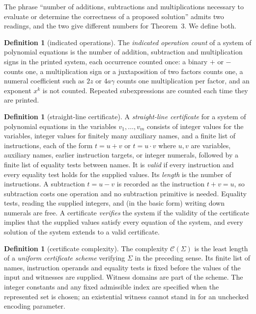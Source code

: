 \documentclass[11pt,letterpaper]{article}
\theoremstyle{definition}
\newtheorem{definition}[theorem]{Definition}
\theoremstyle{remark}
\numberwithin{equation}{section}
\begin{document}
The phrase ``number of additions, subtractions and multiplications necessary
to evaluate or determine the correctness of a proposed solution'' admits two
readings, and the two give different numbers for Theorem~3. We define both.

\begin{definition}[indicated operations]\label{def:indicated}
The \emph{indicated operation count} of a system of polynomial equations is
the number of addition, subtraction and multiplication signs in the printed
system, each occurrence counted once: a binary $+$ or $-$ counts one, a
multiplication sign or a juxtaposition of two factors counts one, a numeral
coefficient such as $2z$ or $4a\gamma$ counts one multiplication per factor,
and an exponent $x^k$ is not counted. Repeated subexpressions are counted each
time they are printed.
\end{definition}

\begin{definition}[straight-line certificate]\label{def:certificate}
A \emph{straight-line certificate} for a system of polynomial equations in
the variables $v_1,\dots,v_m$ consists of integer values for the variables,
integer values for finitely many auxiliary names, and a finite list of
instructions, each of the form $t=u+v$ or $t=u\cdot v$ where $u,v$ are
variables, auxiliary names, earlier instruction targets, or integer numerals,
followed by a finite list of equality tests between names. It is
\emph{valid} if every instruction and every equality test holds for the
supplied values. Its \emph{length} is the number of instructions. A
subtraction $t=u-v$ is recorded as the instruction $t+v=u$, so subtraction
costs one operation and no subtraction primitive is needed. Equality tests,
reading the supplied integers, and (in the basic form) writing down numerals
are free. A certificate \emph{verifies} the system if the validity of the
certificate implies that the supplied values satisfy every equation of the
system, and every solution of the system extends to a valid certificate.
\end{definition}

\begin{definition}[certificate complexity]\label{def:complexity}
The complexity $\mathcal C(\Sigma)$ is the least length of a
\emph{uniform certificate scheme} verifying $\Sigma$ in the preceding
sense. Its finite list of names, instruction operands and equality tests
is fixed before the values of the input and witnesses are supplied.
Witness domains are part of the scheme. The integer constants and any
fixed admissible index are specified when the represented set is chosen;
an existential witness cannot stand in for an unchecked encoding parameter.
\end{definition}
\end{document}

